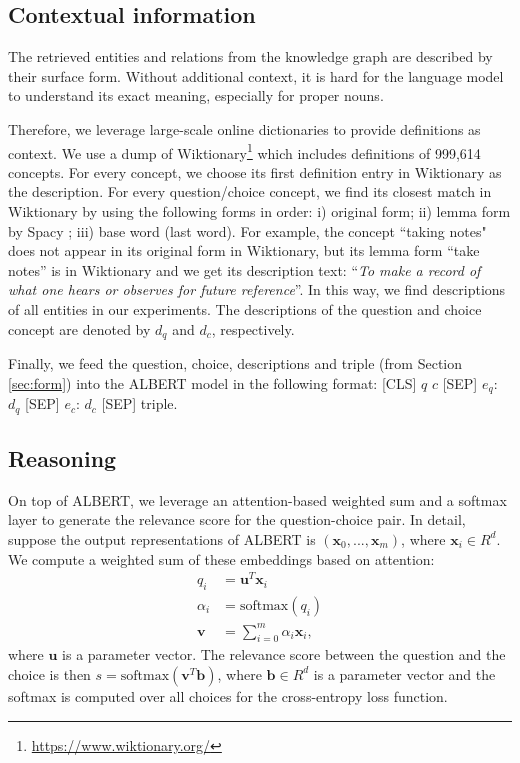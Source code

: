 \documentclass[11pt,a4paper]{article}
\newcommand{\B}[1] {\boldsymbol{#1}}
\def\bb{{\B{b}}}
\def\bu{{\B{u}}}
\def\bv{{\B{v}}}
\def\bx{{\B{x}}}
\begin{document}
\subsection{Contextual information}
\label{sec:context}
The retrieved entities and relations from the knowledge graph are described by their surface form. Without additional context, it is hard for the language model to understand its exact meaning, especially for proper nouns.

Therefore, we leverage large-scale online dictionaries to provide definitions as context. We use a dump of Wiktionary\footnote{\url{https://www.wiktionary.org/}} which includes definitions of 999,614 concepts. For every concept, we choose its first definition entry in Wiktionary as the description. For every question/choice concept, we find its closest match in Wiktionary by using the following forms in order: i) original form; ii) lemma form by Spacy \citep{spacy}; iii) base word (last word).
For example, the concept ``taking notes" does not appear in its original form in Wiktionary, but its lemma form ``take notes'' is in Wiktionary and we get its description text: ``\textit{To make a record of what one hears or observes for future reference}''. In this way, we find descriptions of all entities in our experiments. The descriptions of the question and choice concept are denoted by $d_q$ and $d_c$, respectively.

Finally, we feed the question, choice, descriptions and triple (from Section \ref{sec:form}) into the ALBERT model \citep{ALBERT} in the following format:
[CLS] $q$ $c$ [SEP] $e_q$: $d_q$ [SEP] $e_c$: $d_c$ [SEP] triple.



\vspace{-2mm}
\subsection{Reasoning}
\label{sec:reason}
On top of ALBERT, we leverage an attention-based weighted sum and a softmax layer to generate the relevance score for the question-choice pair. In detail, suppose the output representations of ALBERT is $(\bx_0, ..., \bx_m)$, where $\bx_i\in R^d$. We compute a weighted sum of these embeddings based on attention:
\begin{align}
    q_i &= \bu^T\bx_i \\
    \alpha_i &= \mbox{softmax}(q_i) \\
    \bv &= \sum_{i=0}^m{\alpha_i \bx_i},
\end{align}
where $\bu$ is a parameter vector. The relevance score between the question and the choice is then $s=\mbox{softmax}(\bv^T\bb)$, where $\bb\in R^d$ is a parameter vector and the softmax is computed over all choices for the cross-entropy loss function.
\end{document}
